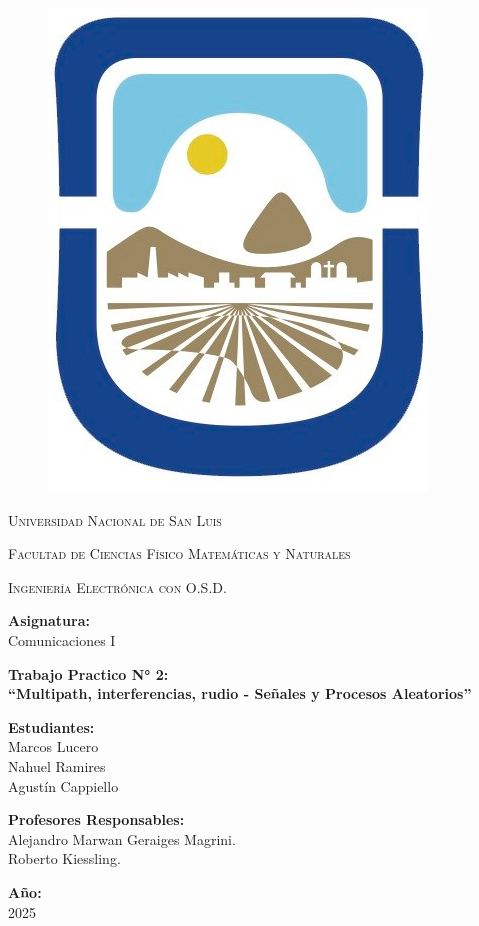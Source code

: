 \documentclass[11pt,a4paper]{article}
\begin{document}
    \begin{titlepage}	  
    		\centering
    		
    		\begin{figure}
    			\centering
    			\includegraphics[width=0.15\linewidth]{caratula/logo-unsl.jpg}
    		\end{figure}     
    		
    		{\scshape\LARGE Universidad Nacional de San Luis\\}
    		{\scshape Facultad de Ciencias Físico Matemáticas y Naturales\par}
    		{\scshape Ingeniería Electrónica con O.S.D.\par}
    		\vspace{2cm} 
    		
    		\Large \textbf {Asignatura:\\} 
    		\bigskip
    		\LARGE {\Huge Comunicaciones I}
    		\vspace{0.3cm}
    		
    		\LARGE \textbf {Trabajo Practico N° 2:\\} 
    		\vspace{0.7cm}
    		\LARGE \textbf {“Multipath, interferencias, rudio - Señales y Procesos Aleatorios”}

    		\vspace{2cm}
    		\LARGE \textbf {Estudiantes:\\} 
    		\LARGE Marcos Lucero \\ Nahuel Ramires\\ Agustín Cappiello\\
    		\bigskip
    		
    		
    		\vspace{1cm}
    		
    		\Large \textbf {Profesores Responsables:\\} 
    		\bigskip
    		\Large Alejandro Marwan Geraiges Magrini. \\ Roberto Kiessling.
    		
    		
    		\vspace{3cm}
    		
    		\Large \textbf {Año:\\} 
    		\Large 2025	
    	\end{titlepage}
    

    

    
\end{document}
